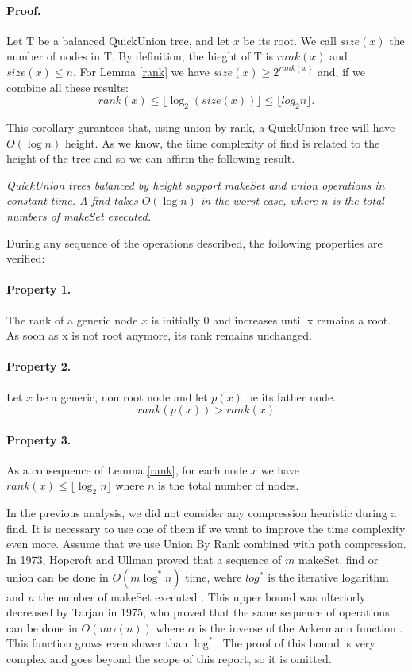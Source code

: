 \documentclass{article}
\begin{document}
\paragraph{Proof.} Let T be a balanced QuickUnion tree, and let $x$ be its root. We call $size(x)$
the number of nodes in T. By definition, the hieght of T is $rank(x)$ and $size(x) \leq n$. For Lemma
\ref{rank} we have $size(x) \geq 2^{rank(x)}$ and, if we combine all these results:
$$rank(x) \leq \lfloor \log_2 (size(x))\rfloor \leq \lfloor log_2 n \rfloor.$$

\bigskip

This corollary gurantees that, using union by rank, a QuickUnion tree will have $O(\log n)$ height. As we know, the time complexity of find
is related to the height of the tree and so we can affirm the following result.

\bigskip

\emph{QuickUnion trees balanced by height support makeSet and union operations in constant time. A find takes $O(\log n)$
in the worst case, where $n$ is the total numbers of makeSet executed.}

During any sequence of the operations described, the following properties are verified:
\paragraph{Property 1.} The rank of a generic node $x$ is initially 0 and increases until x remains a root. As soon as x is not root anymore, its rank
remains unchanged.
\paragraph{Property 2.} Let $x$ be a generic, non root node and let $p(x)$ be its father node.
$$rank(p(x)) > rank(x)$$ 
\paragraph{Property 3.} As a consequence of Lemma \ref{rank}, for each node $x$ we have
$ rank(x) \leq \lfloor \log_2 n \rfloor$ where $n$ is the total number of nodes.

\bigskip

In the previous analysis, we did not  consider any compression heuristic during a find. It is necessary to use one of them if we want to improve the time complexity
even more. 
Assume that we use Union By Rank combined with path compression.
In 1973, Hopcroft and Ullman proved that a sequence of $m$ makeSet, find or  union can be done in $O(m\log^* n)$ time, wehre $log^*$ is the iterative
logarithm and $n$ the number of makeSet executed \cite{hopcroft1973set}. This upper bound was ulteriorly decreased by Tarjan in 1975, who proved that the same sequence of operations
can be done in $O(m\alpha(n))$ where $\alpha$ is the inverse of the Ackermann function \cite{tarjan1975efficiency}. This function grows even slower than $\log^*$.
The proof of this bound is very complex and goes beyond the scope of this report, so it is omitted.  
\end{document}
